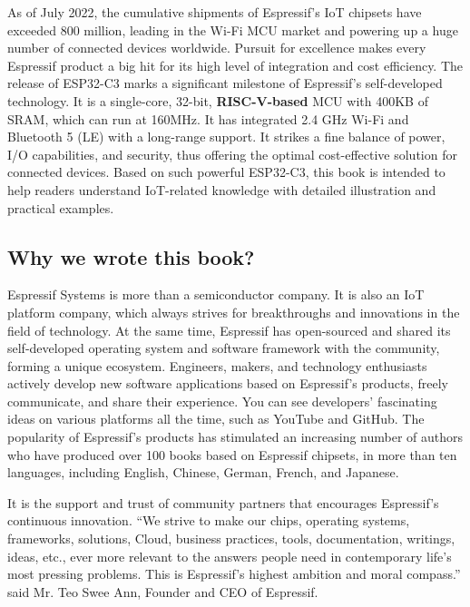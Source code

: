 \documentclass[a4paper,12pt,openany]{book}
\begin{document}
As of July 2022, the cumulative shipments of Espressif’s IoT chipsets have exceeded 800 million, leading in the Wi-Fi MCU market and powering up a huge number of connected devices worldwide. Pursuit for excellence makes every Espressif product a big hit for its high level of integration and cost efficiency. The release of ESP32-C3 marks a significant milestone of Espressif’s self-developed technology. It is a single-core, 32-bit, \textbf{RISC-V-based} MCU with 400KB of SRAM, which can run at 160MHz. It has integrated 2.4 GHz Wi-Fi and Bluetooth 5 (LE) with a long-range support. It strikes a fine balance of power, I/O capabilities, and security, thus offering the optimal cost-effective solution for connected devices. Based on such powerful ESP32-C3, this book is intended to help readers understand IoT-related knowledge with detailed illustration and practical examples.

\subsection*{Why we wrote this book?}
Espressif Systems is more than a semiconductor company. It is also an IoT platform company, which always strives for breakthroughs and innovations in the field of technology. At the same time, Espressif has open-sourced and shared its self-developed operating system and software framework with the community, forming a unique ecosystem. Engineers, makers, and technology enthusiasts actively develop new software applications based on Espressif’s products, freely communicate, and share their experience. You can see developers’ fascinating ideas on various platforms all the time, such as YouTube and GitHub. The popularity of Espressif’s products has stimulated an increasing number of authors who have produced over 100 books based on Espressif chipsets, in more than ten languages, including English, Chinese, German, French, and Japanese.

It is the support and trust of community partners that encourages Espressif's continuous innovation. “We strive to make our chips, operating systems, frameworks, solutions, Cloud, business practices, tools, documentation, writings, ideas, etc., ever more relevant to the answers people need in contemporary life’s most pressing problems. This is Espressif’s highest ambition and moral compass.” said Mr. Teo Swee Ann, Founder and CEO of Espressif.
\end{document}
